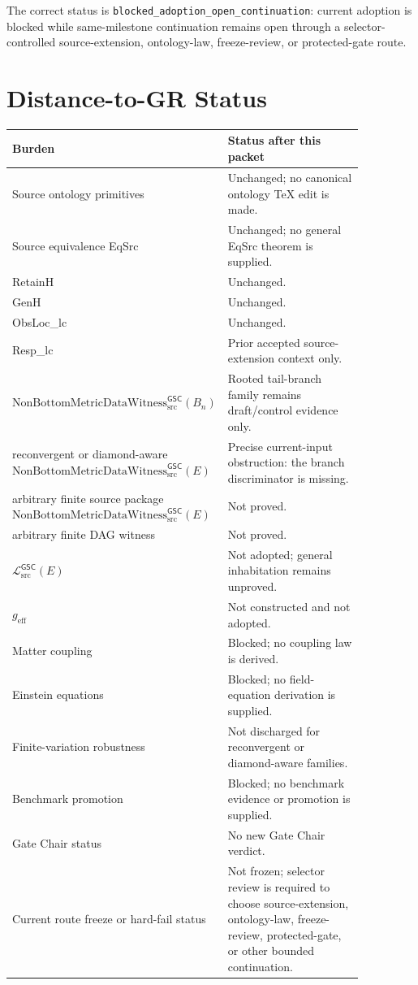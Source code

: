 \documentclass[11pt]{article}
\newcommand{\Witness}{\mathrm{NonBottomMetricDataWitness}_{\mathrm{src}}^{\mathsf{GSC}}}
\newcommand{\MetricData}{\mathcal{L}_{\mathrm{src}}^{\mathsf{GSC}}}
\newcommand{\geff}{g_{\mathrm{eff}}}
\newcommand{\Bn}{B_n}
\begin{document}
The correct status is
\texttt{blocked\_adoption\_open\_continuation}: current adoption is blocked
while same-milestone continuation remains open through a selector-controlled
source-extension, ontology-law, freeze-review, or protected-gate route.

\section{Distance-to-GR Status}

\begin{longtable}{p{0.30\linewidth}p{0.56\linewidth}}
\toprule
Burden & Status after this packet \\
\midrule
Source ontology primitives & Unchanged; no canonical ontology TeX edit is made. \\
Source equivalence EqSrc & Unchanged; no general EqSrc theorem is supplied. \\
RetainH & Unchanged. \\
GenH & Unchanged. \\
ObsLoc\_lc & Unchanged. \\
Resp\_lc & Prior accepted source-extension context only. \\
\(\Witness(\Bn)\) & Rooted tail-branch family remains draft/control evidence only. \\
reconvergent or diamond-aware \(\Witness(E)\) & Precise current-input obstruction:
the branch discriminator is missing. \\
arbitrary finite source package \(\Witness(E)\) & Not proved. \\
arbitrary finite DAG witness & Not proved. \\
\(\MetricData(E)\) & Not adopted; general inhabitation remains unproved. \\
\(\geff\) & Not constructed and not adopted. \\
Matter coupling & Blocked; no coupling law is derived. \\
Einstein equations & Blocked; no field-equation derivation is supplied. \\
Finite-variation robustness & Not discharged for reconvergent or diamond-aware
families. \\
Benchmark promotion & Blocked; no benchmark evidence or promotion is supplied. \\
Gate Chair status & No new Gate Chair verdict. \\
Current route freeze or hard-fail status & Not frozen; selector review is required
to choose source-extension, ontology-law, freeze-review, protected-gate, or
other bounded continuation. \\
\bottomrule
\end{longtable}
\end{document}

